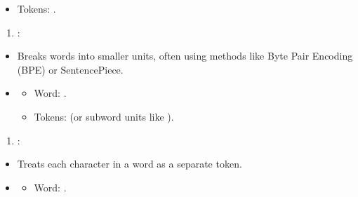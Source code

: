 \documentclass[letterpaper,11pt,english]{sphinxmanual}
\begin{document}
\begin{itemize}
\begin{itemize}
\begin{description}
\begin{itemize}
\item {} 
\sphinxAtStartPar
Tokens: .

\end{itemize}

\end{description}

\end{itemize}
\begin{enumerate}
%
\setcounter{enumi}{2}
\item {} 
\sphinxAtStartPar
{}:

\end{enumerate}
\begin{itemize}
\item {} 
\sphinxAtStartPar
Breaks words into smaller units, often using methods like Byte Pair Encoding (BPE) or SentencePiece.

\item {} \begin{description}
\begin{itemize}
\item {} 
\sphinxAtStartPar
Word: .

\item {} 
\sphinxAtStartPar
Tokens: \sphinxcode{\sphinxupquote{{[}"un", "happiness"{]}}} (or subword units like ).

\end{itemize}

\end{description}

\end{itemize}
\begin{enumerate}
%
\setcounter{enumi}{3}
\item {} 
\sphinxAtStartPar
{}:

\end{enumerate}
\begin{itemize}
\item {} 
\sphinxAtStartPar
Treats each character in a word as a separate token.

\item {} \begin{description}
\begin{itemize}
\item {} 
\sphinxAtStartPar
Word: .


\end{itemize}
\end{description}
\end{itemize}
\end{itemize}
\end{document}
